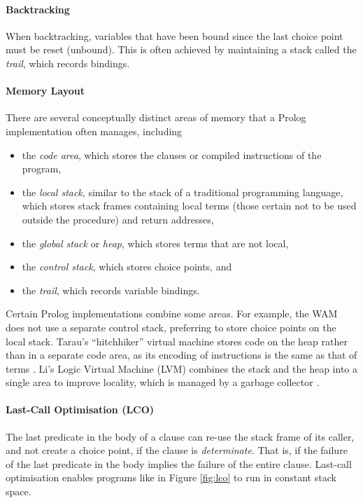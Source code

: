 \paragraph{Backtracking} When backtracking, variables that have been bound since the last choice point must be reset (unbound). This is often achieved by maintaining a stack called the \emph{trail}, which records bindings.

\paragraph{Memory Layout} There are several conceptually distinct areas of memory that a Prolog implementation often manages, including

\begin{itemize}
\item the \emph{code area}, which stores the clauses or compiled instructions of the program,
\item the \emph{local stack}, similar to the stack of a traditional programming language, which stores stack frames containing local terms (those certain not to be used outside the procedure) and return addresses,
\item the \emph{global stack} or \emph{heap}, which stores terms that are not local,
\item the \emph{control stack}, which stores choice points, and
\item the \emph{trail}, which records variable bindings.
\end{itemize}

Certain Prolog implementations combine some areas. For example, the WAM does not use a separate control stack, preferring to store choice points on the local stack. Tarau's ``hitchhiker'' virtual machine stores code on the heap rather than in a separate code area, as its encoding of instructions is the same as that of terms \cite{tarauHitchhikersGuideReinventing2018}. Li's Logic Virtual Machine (LVM) combines the stack and the heap into a single area to improve locality, which is managed by a garbage collector \cite{liEfficientMemoryManagement2000}.

\paragraph{Last-Call Optimisation (LCO)} The last predicate in the body of a clause can re-use the stack frame of its caller, and not create a choice point, if the clause is \emph{determinate}. That is, if the failure of the last predicate in the body implies the failure of the entire clause. Last-call optimisation enables programs like in Figure \ref{fig:lco} to run in constant stack space.

